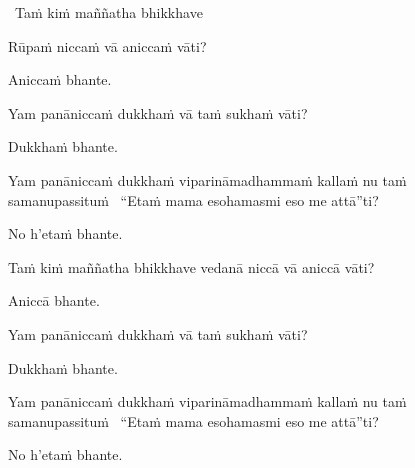 \begin{pali-leader}
  \anglebracketleft\ \hspace{-0.5mm}Taṁ kiṁ maññatha bhikkhave \hspace{-0.5mm}\anglebracketright\
\end{pali-leader}
\begin{pali-hangtogether}
  Rūpaṁ niccaṁ vā aniccaṁ vāti?
\end{pali-hangtogether}
\begin{pali-hangtogether}
  Aniccaṁ bhante.
\end{pali-hangtogether}
\begin{pali-hangtogether}
  Yam panāniccaṁ dukkhaṁ vā taṁ sukhaṁ vāti?
\end{pali-hangtogether}
\begin{pali-hangtogether}
  Dukkhaṁ bhante.
\end{pali-hangtogether}
\begin{pali-hangtogether}
  Yam panāniccaṁ dukkhaṁ viparināmadhammaṁ kallaṁ nu taṁ samanupassituṁ \breathmark\ ``Etaṁ mama esohamasmi eso me attā''ti?
\end{pali-hangtogether}
\begin{pali-hangtogether}
  No h'etaṁ bhante.
\end{pali-hangtogether}

\begin{pali-hang}
  Taṁ kiṁ maññatha bhikkhave vedanā niccā vā aniccā vāti?
\end{pali-hang}
\begin{pali-hangtogether}
  Aniccā bhante.
\end{pali-hangtogether}
\begin{pali-hangtogether}
  Yam panāniccaṁ dukkhaṁ vā taṁ sukhaṁ vāti?
\end{pali-hangtogether}
\begin{pali-hangtogether}
  Dukkhaṁ bhante.
\end{pali-hangtogether}
\begin{pali-hangtogether}
  Yam panāniccaṁ dukkhaṁ viparināmadhammaṁ kallaṁ nu taṁ samanupassituṁ \breathmark\ ``Etaṁ mama esohamasmi eso me attā''ti?
\end{pali-hangtogether}
\begin{pali-hangtogether}
  No h'etaṁ bhante.
\end{pali-hangtogether}

